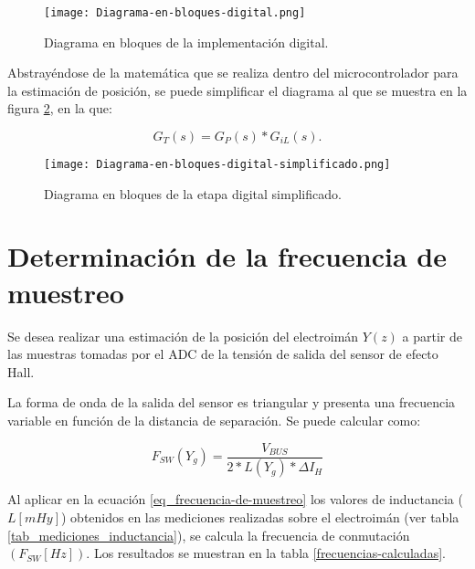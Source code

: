 \begin{figure}[H]
	\centering
	\texttt{[image: Diagrama-en-bloques-digital.png]}
	\caption{Diagrama en bloques de la implementación digital.}
	\label{fig:diag-en-bloques-digital}
\end{figure}

\noindent Abstrayéndose de la matemática que se realiza dentro del microcontrolador para la estimación de posición, se puede simplificar el diagrama al que se muestra en la figura \ref{fig:diag-en-bloques-digital-simplif}, en la que:

\begin{equation} 
	G_T(s) = G_P(s) * G_{iL}(s).
\end{equation}

\begin{figure}[H]
	\centering
	\texttt{[image: Diagrama-en-bloques-digital-simplificado.png]}
	\caption{Diagrama en bloques de la etapa digital simplificado.}
	\label{fig:diag-en-bloques-digital-simplif}
\end{figure}


\section{Determinación de la frecuencia de muestreo}

\noindent Se desea realizar una estimación de la posición del electroimán $Y(z)$  a partir de las muestras tomadas por el ADC de la tensión de salida del sensor de efecto Hall.

\noindent La forma de onda de la salida del sensor es triangular y presenta una frecuencia variable en función de la distancia de separación. Se puede calcular como:

\begin{equation} \label{eq_frecuencia-de-muestreo}
	F_{SW}(Y_g)=\frac{V_{BUS}}{2 * L(Y_g) * \Delta I_H}
\end{equation}



 Al aplicar en la ecuación \ref{eq_frecuencia-de-muestreo} los valores de inductancia ($L[mHy]$) obtenidos en las mediciones realizadas sobre el electroimán (ver tabla \ref{tab_mediciones_inductancia}), se calcula la frecuencia de conmutación  $(F_{SW}[Hz])$. Los resultados se muestran en la tabla \ref{frecuencias-calculadas}.



